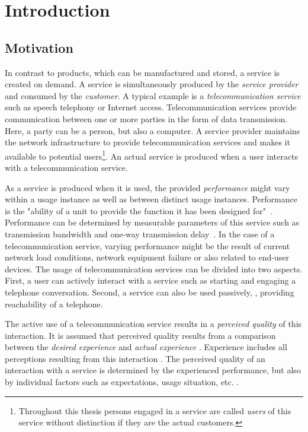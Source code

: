 \chapter{Introduction}\label{chap:01}

\section{Motivation}
In contrast to products, which can be manufactured and stored, a service is created on demand.
A service is simultaneously produced by the \emph{service provider} and consumed by the \emph{customer}.
A typical example is a \emph{telecommunication service} such as speech telephony or Internet access.
Telecommunication services provide communication between one or more parties in the form of data transmission.
Here, a party can be a person, but also a computer.
A service provider maintains the network infrastructure to provide telecommunication services and makes it available to potential users\footnote{Throughout this thesis persons engaged in a service are called \emph{users} of this service without distinction if they are the actual customers.}.
An actual service is produced when a user interacts with a telecommunication service.

As a service is produced when it is used, the provided \emph{performance} might vary within a usage instance as well as between distinct usage instances.
Performance is the "ability of a unit to provide the function it has been designed for"~\citep[][p.\,360]{moller_quality_2005}.
Performance can be determined by measurable parameters of this service such as transmission bandwidth and one-way transmission delay~\citep[][p.\,12]{moller_assessment_2000}.
In the case of a telecommunication service, varying performance might be the result of current network load conditions, network equipment failure or also related to end-user devices.
The usage of telecommunication services can be divided into two aspects.
First, a user can actively interact with a service such as starting and engaging a telephone conversation.
Second, a service can also be used passively, \eg, providing reachability of a telephone.

The active use of a telecommunication service results in a \emph{perceived quality} of this interaction.
It is assumed that perceived quality results from a comparison between the \emph{desired experience} and \emph{actual experience} \citep[][p.\,13]{raake_quality_2014}. %
Experience includes all perceptions resulting from this interaction \citep[][p.\,13]{raake_quality_2014}.
The perceived quality of an interaction with a service is determined by the experienced performance, but also by individual factors such as expectations, usage situation, etc. \citep[\eg,][p.\,55ff.]{reiter_factors_2014}.

